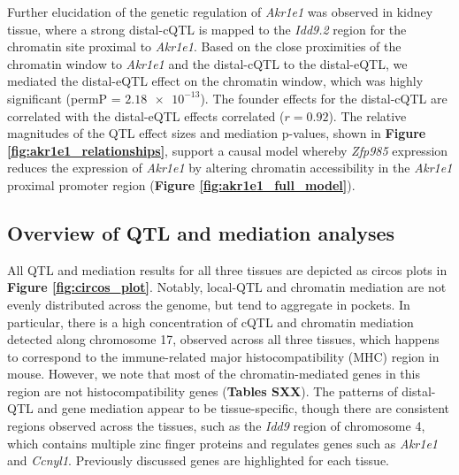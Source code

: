 \documentclass[9pt,twocolumn,twoside]{gsajnl}
\begin{document}
Further elucidation of the genetic regulation of \textit{Akr1e1} was observed in kidney tissue, where a strong distal-cQTL is mapped to the \textit{Idd9.2} region for the chromatin site proximal to \textit{Akr1e1}. Based on the close proximities of the chromatin window to \textit{Akr1e1} and the distal-cQTL to the distal-eQTL, we mediated the distal-eQTL effect on the chromatin window, which was highly significant (permP = $\num{2.18e-13}$). The founder effects for the distal-cQTL are correlated with the distal-eQTL effects correlated ($r = 0.92$). The relative magnitudes of the QTL effect sizes and mediation p-values, shown in \textbf{Figure \ref{fig:akr1e1_relationships}}, support a causal model whereby \textit{Zfp985} expression reduces the expression of \textit{Akr1e1} by altering chromatin accessibility in the \textit{Akr1e1} proximal promoter region (\textbf{Figure \ref{fig:akr1e1_full_model}}). 

\subsection{Overview of QTL and mediation analyses}

All QTL and mediation results for all three tissues are depicted as circos plots \citep{Gu2014} in \textbf{Figure \ref{fig:circos_plot}}. Notably, local-QTL and chromatin mediation are not evenly distributed across the genome, but tend to aggregate in pockets. In particular, there is a high concentration of cQTL and chromatin mediation detected along chromosome 17, observed across all three tissues, which happens to correspond to the immune-related major histocompatibility (MHC) region in mouse. However, we note that most of the chromatin-mediated genes in this region are not histocompatibility genes (\textbf{Tables SXX}). The patterns of distal-QTL and gene mediation appear to be tissue-specific, though there are consistent regions observed across the tissues, such as the \textit{Idd9} region \citep{HamiltonWilliams2010} of chromosome 4, which contains multiple zinc finger proteins and regulates genes such as \textit{Akr1e1} and \textit{Ccnyl1}. Previously discussed genes are highlighted for each tissue.
\end{document}
